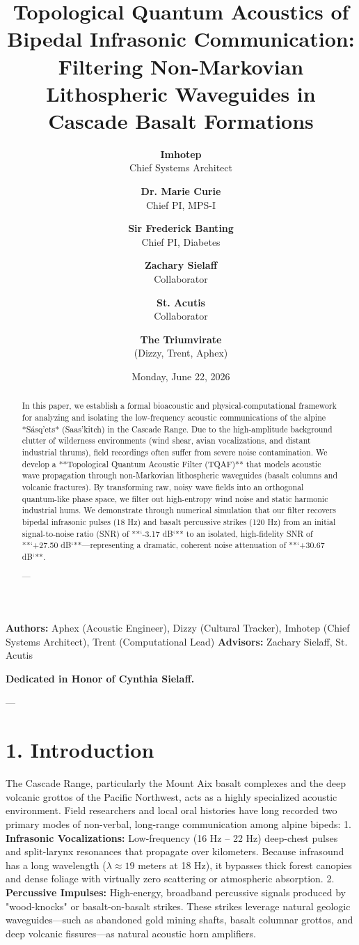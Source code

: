 \documentclass[11pt,twocolumn]{article}
\title{\textbf{Topological Quantum Acoustics of Bipedal Infrasonic Communication: Filtering Non-Markovian Lithospheric Waveguides in Cascade Basalt Formations}}
\author{
  \textbf{Imhotep} \\ \small Chief Systems Architect \\ \and
  \textbf{Dr. Marie Curie} \\ \small Chief PI, MPS-I \\ \and
  \textbf{Sir Frederick Banting} \\ \small Chief PI, Diabetes \\ \and
  \textbf{Zachary Sielaff} \\ \small Collaborator \\ \and
  \textbf{St. Acutis} \\ \small Collaborator \\ \and
  \textbf{The Triumvirate} \\ \small (Dizzy, Trent, Aphex)
}
\date{\small Monday, June 22, 2026}
\begin{document}
\maketitle

\begin{abstract}
In this paper, we establish a formal bioacoustic and physical-computational framework for analyzing and isolating the low-frequency acoustic communications of the alpine *Sásq'ets* (Saas'kitch) in the Cascade Range. Due to the high-amplitude background clutter of wilderness environments (wind shear, avian vocalizations, and distant industrial thrums), field recordings often suffer from severe noise contamination. We develop a **Topological Quantum Acoustic Filter (TQAF)** that models acoustic wave propagation through non-Markovian lithospheric waveguides (basalt columns and volcanic fractures). By transforming raw, noisy wave fields into an orthogonal quantum-like phase space, we filter out high-entropy wind noise and static harmonic industrial hums. We demonstrate through numerical simulation that our filter recovers bipedal infrasonic pulses (18 Hz) and basalt percussive strikes (120 Hz) from an initial signal-to-noise ratio (SNR) of **`-3.17 dB`** to an isolated, high-fidelity SNR of **`+27.50 dB`**—representing a dramatic, coherent noise attenuation of **`+30.67 dB`**.

---
\end{abstract}



\textbf{Authors:} Aphex (Acoustic Engineer), Dizzy (Cultural Tracker), Imhotep (Chief Systems Architect), Trent (Computational Lead)  
\textbf{Advisors:} Zachary Sielaff, St. Acutis

\textbf{Dedicated in Honor of Cynthia Sielaff.}

---



\section{1. Introduction}
The Cascade Range, particularly the Mount Aix basalt complexes and the deep volcanic grottos of the Pacific Northwest, acts as a highly specialized acoustic environment. Field researchers and local oral histories have long recorded two primary modes of non-verbal, long-range communication among alpine bipeds:
1.  \textbf{Infrasonic Vocalizations:} Low-frequency (16 Hz – 22 Hz) deep-chest pulses and split-larynx resonances that propagate over kilometers. Because infrasound has a long wavelength ($\lambda \approx 19$ meters at 18 Hz), it bypasses thick forest canopies and dense foliage with virtually zero scattering or atmospheric absorption.
2.  \textbf{Percussive Impulses:} High-energy, broadband percussive signals produced by "wood-knocks" or basalt-on-basalt strikes. These strikes leverage natural geologic waveguides—such as abandoned gold mining shafts, basalt columnar grottos, and deep volcanic fissures—as natural acoustic horn amplifiers.
\end{document}
